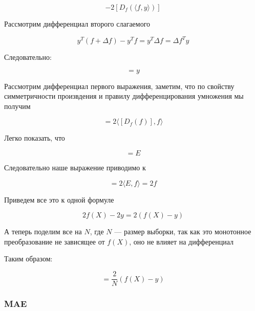 \documentclass{article}
\begin{document}
    \begin{equation}
        [D_{f} (\langle f, f  \rangle)] - 2 [D_{f} (\langle f, y  \rangle)] 
    \end{equation}

    Рассмотрим дифференциал второго слагаемого 

    \begin{equation}
        y^{T} (f + \Delta f) - y^{T} f = y^{T} \Delta f = \Delta f^{T} y
    \end{equation}

    Следовательно: 

    \begin{equation}
        [D_{f} (\langle f, y  \rangle)] = y
    \end{equation}

    Рассмотрим дифференциал первого выражения, заметим, что по свойству симметричности произвдения и правилу дифференцирования умножения мы получим

    \begin{equation}
        [D_{f} (\langle f, f  \rangle)] = 2 \langle[D_{f} (f)], f  \rangle
    \end{equation}

    Легко показать, что 

    \begin{equation}
        [D_{f} (f)] = E  
    \end{equation}

    Следовательно наше выражение приводимо к

    \begin{equation}
        [D_{f} (\langle f, f  \rangle)] = 2 \langle E, f  \rangle = 2 f
    \end{equation}

    Приведем все это к одной формуле 

    \begin{equation}
        2 f(X) - 2 y = 2 (f(X) - y)
    \end{equation}

    А теперь поделим все на $N$, где $N$ --- размер выборки, так как это монотонное преобразование не зависящее от $f(X)$, оно не влияет на дифференциал
    
    Таким образом: 

    \begin{equation}
        [D_{f(X)} (MSE)] = \frac{2}{N} (f(X) - y)
    \end{equation}

    \subsubsection{MAE}
\end{document}
